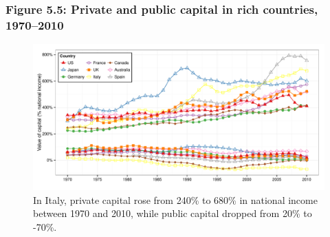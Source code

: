 \documentclass[t]{beamer}\usepackage[]{graphicx}\usepackage[]{color}
\newenvironment{knitrout}{}{} %
\begin{document}
\begin{frame}[label=Figure55]
\frametitle{Figure 5.5: Private and public capital in rich countries, 1970--2010}
\begin{figure}[t]
\begin{minipage}[b]{\textwidth}
\centering
\begin{knitrout}\footnotesize
{}\color{fgcolor}

{\centering \includegraphics[width=1\linewidth,height=0.75\textheight]{figures/color/Figure_5_5} 

}



\end{knitrout}
\caption{In Italy, private capital rose from 240\% to 680\% in national income between 1970 and 2010, while public capital dropped from 20\% to -70\%.}
\end{minipage}
\end{figure}
\end{frame}
\end{document}
